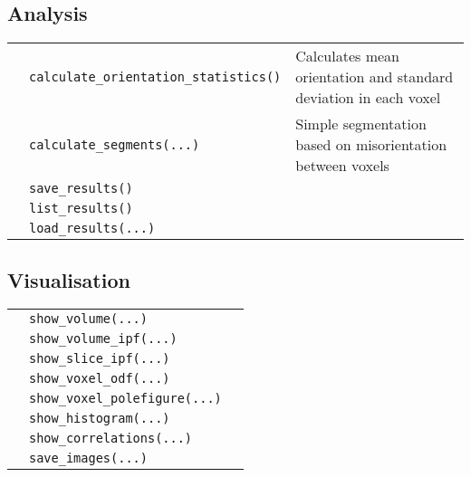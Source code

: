 \subsection{Analysis}
\begin{table}[h!]
    \centering
    \begin{tabular}{| l | l | l |} 
        \hline
         & \texttt{calculate\_orientation\_statistics()} & Calculates mean orientation and standard deviation in each voxel\\
         & \texttt{calculate\_segments(...)} & Simple segmentation based on misorientation between voxels\\
      \hline
         & \texttt{save\_results()} & \\
         & \texttt{list\_results()} & \\
         & \texttt{load\_results(...)} & \\
      \hline
     \end{tabular}
\end{table}

\subsection{Visualisation}
\begin{table}[h!]
    \centering
    \begin{tabular}{| l | l | l |} 
        \hline
            & \texttt{show\_volume(...)} & \\
            & \texttt{show\_volume\_ipf(...)} & \\
            & \texttt{show\_slice\_ipf(...)} & \\
            & \texttt{show\_voxel\_odf(...)} & \\
            & \texttt{show\_voxel\_polefigure(...)} & \\
            & \texttt{show\_histogram(...)} & \\
            & \texttt{show\_correlations(...)} & \\
        \hline
            & \texttt{save\_images(...)} & \\
        \hline
     \end{tabular}
\end{table}
